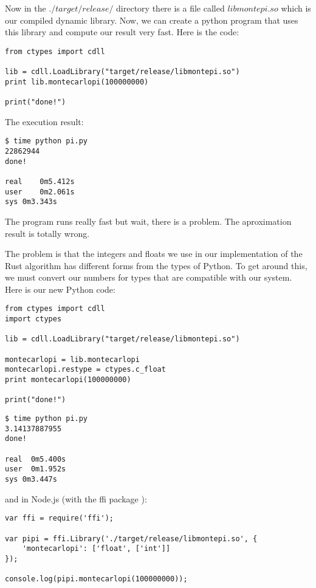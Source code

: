 Now in the $./target/release/$ directory there is a file called
$libmontepi.so$ which is our compiled dynamic library. Now, we can create a
python program that uses this library and compute our result very fast. Here is
the code:

\begin{lstlisting}[label=perrr,caption=Python wrong code for calling the library]
from ctypes import cdll

lib = cdll.LoadLibrary("target/release/libmontepi.so")
print lib.montecarlopi(100000000)

print("done!")
\end{lstlisting}

The execution result:

\begin{verbatim}
$ time python pi.py 
22862944
done!

real    0m5.412s
user    0m2.061s
sys 0m3.343s
\end{verbatim}

The program runs really fast but wait, there is a problem. The aproximation
result is totally wrong.

The problem is that the integers and floats we use in our implementation of the
Rust algorithm has different forms from the types of Python. To get around this,
we must convert our numbers for types that are compatible with our system. Here
is our new Python code:

\begin{lstlisting}[label=pytonright,caption=Python right code]
from ctypes import cdll
import ctypes

lib = cdll.LoadLibrary("target/release/libmontepi.so")

montecarlopi = lib.montecarlopi
montecarlopi.restype = ctypes.c_float
print montecarlopi(100000000)

print("done!")
\end{lstlisting}

\begin{verbatim}
$ time python pi.py 
3.14137887955
done!

real  0m5.400s
user  0m1.952s
sys 0m3.447s
\end{verbatim}

and in Node.js (with the ffi package  \cite{8_4}):

\begin{lstlisting}[label=njs,caption=Node calling our Rust library]
var ffi = require('ffi');

var pipi = ffi.Library('./target/release/libmontepi.so', {
    'montecarlopi': ['float', ['int']]
});

console.log(pipi.montecarlopi(100000000));
\end{lstlisting}


